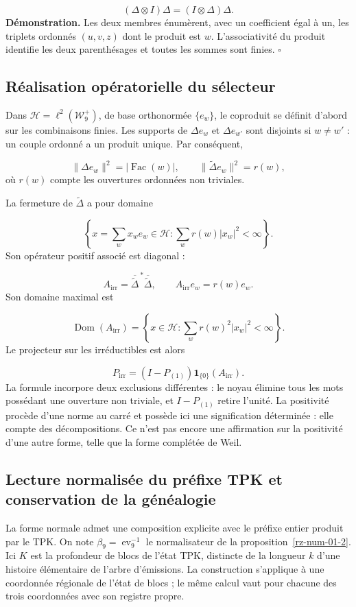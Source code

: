 \[
(\Delta\otimes I)\Delta=(I\otimes\Delta)\Delta.
\]
\textbf{Démonstration.} Les deux membres énumèrent, avec un coefficient égal à un, les triplets ordonnés $(u,v,z)$ dont le produit est $w$. L'associativité du produit identifie les deux parenthésages et toutes les sommes sont finies. \hfill\(\square\)

\subsection{Réalisation opératorielle du sélecteur}
Dans \(\mathcal H=\ell^2(\mathcal W_9^+)\), de base orthonormée \(\{e_w\}\), le coproduit se définit d’abord sur les combinaisons finies. Les supports de $\Delta e_w$ et $\Delta e_{w'}$ sont disjoints si $w\ne w'$ : un couple ordonné a un produit unique. Par conséquent,

\[
\|\Delta e_w\|^2=|\operatorname{Fac}(w)|,
\qquad
\|\widetilde\Delta e_w\|^2=r(w),
\]
où $r(w)$ compte les ouvertures ordonnées non triviales.

La fermeture de $\widetilde\Delta$ a pour domaine

\[
\left\{x=\sum_wx_we_w\in\mathcal H:\sum_wr(w)|x_w|^2<\infty\right\}.
\]
Son opérateur positif associé est diagonal :

\[
A_{\mathrm{irr}}=\overline{\widetilde\Delta}^{\,*}\overline{\widetilde\Delta},
\qquad A_{\mathrm{irr}}e_w=r(w)e_w.
\]
Son domaine maximal est

\[
\operatorname{Dom}(A_{\mathrm{irr}})
=\left\{x\in\mathcal H:\sum_wr(w)^2|x_w|^2<\infty\right\}.
\]
Le projecteur sur les irréductibles est alors

\[
P_{\mathrm{irr}}=(I-P_{(1)})\mathbf1_{\{0\}}(A_{\mathrm{irr}}).
\]
La formule incorpore deux exclusions différentes : le noyau élimine tous les mots possédant une ouverture non triviale, et $I-P_{(1)}$ retire l'unité. La positivité procède d'une norme au carré et possède ici une signification déterminée : elle compte des décompositions. Ce n'est pas encore une affirmation sur la positivité d'une autre forme, telle que la forme complétée de Weil.

\subsection{Lecture normalisée du préfixe TPK et conservation de la généalogie}
La forme normale admet une composition explicite avec le préfixe entier produit par le TPK. On note \(\beta_9=\operatorname{ev}_9^{-1}\) le normalisateur de la proposition~\ref{rz-num-01-2}. Ici \(K\) est la profondeur de blocs de l’état TPK, distincte de la longueur \(k\) d’une histoire élémentaire de l’arbre d’émissions. La construction s’applique à une coordonnée régionale de l’état de blocs ; le même calcul vaut pour chacune des trois coordonnées avec son registre propre.

